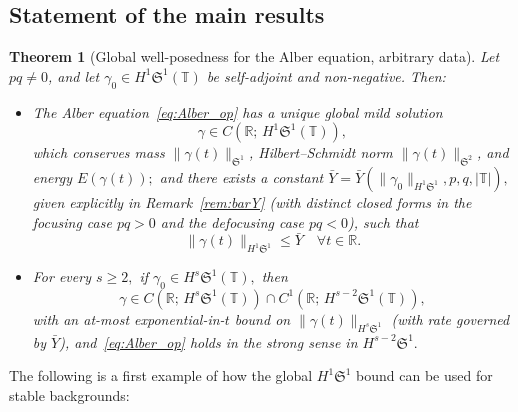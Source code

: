 \documentclass[11pt]{amsart}
\newtheorem{mainthm}{Theorem}
\theoremstyle{definition}
\newtheorem{remark}[theorem]{Remark}
\newcommand{\R}{\mathbb{R}}
\newcommand{\T}{\mathbb{T}}
\newcommand{\Sp}{\mathfrak{S}}
\begin{document}
\subsection{Statement of the main results}\label{subsec:main_thms}

\begin{mainthm}[Global well-posedness for the Alber equation, arbitrary data]\label{thm:main}
Let $pq\ne 0$, and let $\gamma_0\in H^1\Sp^1(\T)$ be self-adjoint and non-negative. Then:
\begin{itemize}
\item[(a)] The Alber equation~\eqref{eq:Alber_op} has a unique global mild solution
\[
  \gamma\in C(\R;\,H^1\Sp^1(\T)),
\]
which conserves mass $\|\gamma(t)\|_{\Sp^1}$, Hilbert--Schmidt norm $\|\gamma(t)\|_{\Sp^2}$, and energy $E(\gamma(t));$ and there exists a constant $\bar Y=\bar Y(\|\gamma_0\|_{H^1\Sp^1},p,q,|\T|),$ given explicitly in Remark~\ref{rem:barY} (with distinct closed forms in the focusing case $pq>0$ and the defocusing case $pq<0$), such that
\[
\|\gamma(t)\|_{H^1\Sp^1} \le \bar Y \quad \forall t \in \R.
\]
\item[(b)] For every $s\ge 2,$ if $\gamma_0\in H^s\Sp^1(\T),$ then
\[
  \gamma\in C(\R;\,H^s\Sp^1(\T))\cap C^1(\R;\,H^{s-2}\Sp^1(\T)),
\]
with an at-most exponential-in-$t$ bound on $\|\gamma(t)\|_{H^s\Sp^1}$ (with rate governed by $\bar Y$), and~\eqref{eq:Alber_op} holds in the strong sense in $H^{s-2}\Sp^1.$
\end{itemize}
\end{mainthm}


\smallskip 

The following  is a first example of how the global $H^1\Sp^1$ bound can be used for stable backgrounds:
\end{document}
